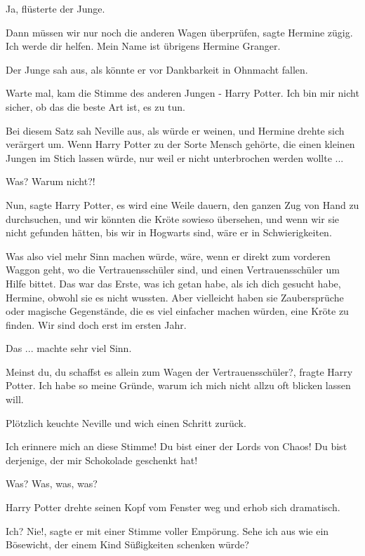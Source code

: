 \glqq{}Ja\grqq{}, flüsterte der Junge.

\glqq{}Dann müssen wir nur noch die anderen Wagen überprüfen\grqq{}, sagte
Hermine zügig. \glqq{}Ich werde dir helfen. Mein Name ist übrigens Hermine
Granger.\grqq{}

Der Junge sah aus, als könnte er vor Dankbarkeit in Ohnmacht fallen.

\glqq{}Warte mal\grqq{}, kam die Stimme des anderen Jungen - Harry Potter. \glqq{}
Ich bin mir nicht sicher, ob das die beste Art ist, es zu tun.\grqq{}

Bei diesem Satz sah Neville aus, als würde er weinen, und Hermine drehte sich
verärgert um. Wenn Harry Potter zu der Sorte Mensch gehörte, die einen kleinen
Jungen im Stich lassen würde, nur weil er nicht unterbrochen werden wollte ...

\glqq{}Was? Warum nicht?!\grqq{}

\glqq{}Nun\grqq{}, sagte Harry Potter, \glqq{}es wird eine Weile dauern, den
ganzen Zug von Hand zu durchsuchen, und wir könnten die Kröte sowieso übersehen,
und wenn wir sie nicht gefunden hätten, bis wir in Hogwarts sind, wäre er in
Schwierigkeiten.

Was also viel mehr Sinn machen würde, wäre, wenn er direkt zum vorderen Waggon
geht, wo die Vertrauensschüler sind, und einen Vertrauensschüler um Hilfe
bittet. Das war das Erste, was ich getan habe, als ich dich gesucht habe,
Hermine, obwohl sie es nicht wussten. Aber vielleicht haben sie Zaubersprüche
oder magische Gegenstände, die es viel einfacher machen würden, eine Kröte zu
finden. Wir sind doch erst im ersten Jahr.\grqq{}

Das ... machte sehr viel Sinn.

\glqq{}Meinst du, du schaffst es allein zum Wagen der Vertrauensschüler?\grqq{},
fragte Harry Potter. \glqq{}Ich habe so meine Gründe, warum ich mich nicht allzu
oft blicken lassen will.\grqq{}

Plötzlich keuchte Neville und wich einen Schritt zurück.

\glqq{}Ich erinnere mich an diese Stimme! Du bist einer der Lords von Chaos! Du
bist derjenige, der mir Schokolade geschenkt hat!\grqq{}

Was? Was, was, was?

Harry Potter drehte seinen Kopf vom Fenster weg und erhob sich dramatisch.

\glqq{}Ich? Nie!\grqq{}, sagte er mit einer Stimme voller Empörung. \glqq{}Sehe
ich aus wie ein Bösewicht, der einem Kind Süßigkeiten schenken würde?\grqq{}

